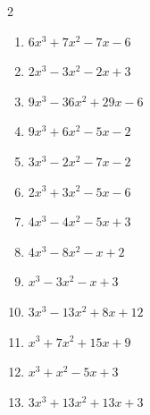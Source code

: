 \begin{multicols}{2}
\begin{enumerate}

  \item $6x^{3}+7x^{2}-7x-6$

        \phantom{$=(2x+3)(3x+2)(x-1)$}

  \item $2x^{3}-3x^{2}-2x+3$

        \phantom{$=(2x-3)(x+1)(x-1)$}

  \item $9x^{3}-36x^{2}+29x-6$

        \phantom{$=(3x-1)(3x-2)(x-3)$}

  \item $9x^{3}+6x^{2}-5x-2$

        \phantom{$=(3x+1)(3x-2)(x+1)$}

\columnbreak %

\resetques

  \item $3x^{3}-2x^{2}-7x-2$

        \phantom{$=(3x+1)(x+1)(x-2)$}

  \item $2x^{3}+3x^{2}-5x-6$

        \phantom{$=(2x-3)(x+1)(x+2)$}

  \item $4x^{3}-4x^{2}-5x+3$

        \phantom{$=(2x-1)(2x-3)(x+1)$}

  \item $4x^{3}-8x^{2}-x+2$

        \phantom{$=(2x+1)(2x-1)(x-2)$}

  \item $x^{3}-3x^{2}-x+3$

        \phantom{$=(x+1)(x-1)(x-3)$}

\columnbreak %

  \item $3x^{3}-13x^{2}+8x+12$

        \phantom{$=(3x+2)(x-2)(x-3)$}

  \item $x^{3}+7x^{2}+15x+9$


  \item $x^{3}+x^{2}-5x+3$


  \item $3x^{3}+13x^{2}+13x+3$


\end{enumerate}
\end{multicols}

